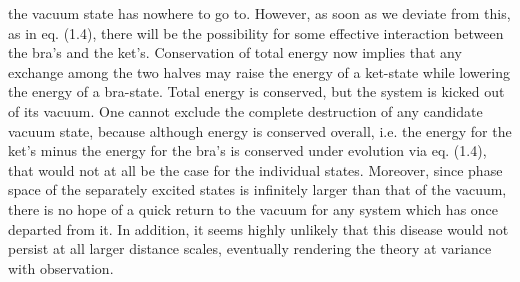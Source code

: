 the vacuum state has nowhere to go to.  However, as soon as we deviate
from this, as in eq. (1.4), there will be the possibility for some
effective interaction between the bra's and the ket's. Conservation of
total energy now implies that any exchange among the two halves may
raise the energy of a ket-state while lowering the energy of a
bra-state. Total energy is conserved, but the system is kicked out of
its vacuum. One cannot exclude the complete destruction of any
candidate vacuum state, because although energy is conserved overall,
i.e. the energy for the ket's minus the energy for the bra's is
conserved under evolution via eq. (1.4), that would not at all be the
case for the individual states. Moreover, since phase space of the
separately excited states is infinitely larger than that of the vacuum,
there is no hope of a quick return to the vacuum for any system which
has once departed from it.  In addition, it seems highly unlikely that
this disease would not persist at all larger distance scales,
eventually rendering the theory at variance with observation.


